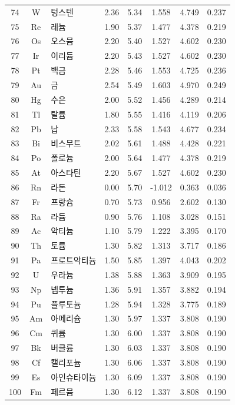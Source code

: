 \documentclass[12pt,a4paper]{article}
\begin{document}
\begin{longtable}{|c|c|p{2.5cm}|c|c|c|c|c|}
		74 & W & 텅스텐 & 2.36 & 5.34 & 1.558 & 4.749 & 0.237 \\
		75 & Re & 레늄 & 1.90 & 5.37 & 1.477 & 4.378 & 0.219 \\
		76 & Os & 오스뮴 & 2.20 & 5.40 & 1.527 & 4.602 & 0.230 \\
		77 & Ir & 이리듐 & 2.20 & 5.43 & 1.527 & 4.602 & 0.230 \\
		78 & Pt & 백금 & 2.28 & 5.46 & 1.553 & 4.725 & 0.236 \\
		79 & Au & 금 & 2.54 & 5.49 & 1.603 & 4.970 & 0.249 \\
		80 & Hg & 수은 & 2.00 & 5.52 & 1.456 & 4.289 & 0.214 \\
		81 & Tl & 탈륨 & 1.80 & 5.55 & 1.416 & 4.119 & 0.206 \\
		82 & Pb & 납 & 2.33 & 5.58 & 1.543 & 4.677 & 0.234 \\
		83 & Bi & 비스무트 & 2.02 & 5.61 & 1.488 & 4.428 & 0.221 \\
		84 & Po & 폴로늄 & 2.00 & 5.64 & 1.477 & 4.378 & 0.219 \\
		85 & At & 아스타틴 & 2.20 & 5.67 & 1.527 & 4.602 & 0.230 \\
		86 & Rn & 라돈 & 0.00 & 5.70 & -1.012 & 0.363 & 0.036 \\
		87 & Fr & 프랑슘 & 0.70 & 5.73 & 0.956 & 2.602 & 0.130 \\
		88 & Ra & 라듐 & 0.90 & 5.76 & 1.108 & 3.028 & 0.151 \\
		89 & Ac & 악티늄 & 1.10 & 5.79 & 1.222 & 3.395 & 0.170 \\
		90 & Th & 토륨 & 1.30 & 5.82 & 1.313 & 3.717 & 0.186 \\
		91 & Pa & 프로트악티늄 & 1.50 & 5.85 & 1.397 & 4.043 & 0.202 \\
		92 & U & 우라늄 & 1.38 & 5.88 & 1.363 & 3.909 & 0.195 \\
		93 & Np & 넵투늄 & 1.36 & 5.91 & 1.357 & 3.882 & 0.194 \\
		94 & Pu & 플루토늄 & 1.28 & 5.94 & 1.328 & 3.775 & 0.189 \\
		95 & Am & 아메리슘 & 1.30 & 5.97 & 1.337 & 3.808 & 0.190 \\
		96 & Cm & 퀴륨 & 1.30 & 6.00 & 1.337 & 3.808 & 0.190 \\
		97 & Bk & 버클륨 & 1.30 & 6.03 & 1.337 & 3.808 & 0.190 \\
		98 & Cf & 캘리포늄 & 1.30 & 6.06 & 1.337 & 3.808 & 0.190 \\
		99 & Es & 아인슈타이늄 & 1.30 & 6.09 & 1.337 & 3.808 & 0.190 \\
		100 & Fm & 페르뮴 & 1.30 & 6.12 & 1.337 & 3.808 & 0.190 \\

\end{longtable}
\end{document}
